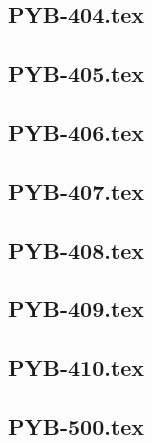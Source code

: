 \renewcommand{\xxexo}{PYB-404.tex} 
\subsection*{\xxexo} 
\graphicspath{{../../exos/python_bases/PYB-404/}}
 
 
\renewcommand{\xxexo}{PYB-405.tex} 
\subsection*{\xxexo} 
\graphicspath{{../../exos/python_bases/PYB-405/}}
 
 
\renewcommand{\xxexo}{PYB-406.tex} 
\subsection*{\xxexo} 
\graphicspath{{../../exos/python_bases/PYB-406/}}
 
 
\renewcommand{\xxexo}{PYB-407.tex} 
\subsection*{\xxexo} 
\graphicspath{{../../exos/python_bases/PYB-407/}}
 
 
\renewcommand{\xxexo}{PYB-408.tex} 
\subsection*{\xxexo} 
\graphicspath{{../../exos/python_bases/PYB-408/}}
 
 
\renewcommand{\xxexo}{PYB-409.tex} 
\subsection*{\xxexo} 
\graphicspath{{../../exos/python_bases/PYB-409/}}
 
 
\renewcommand{\xxexo}{PYB-410.tex} 
\subsection*{\xxexo} 
\graphicspath{{../../exos/python_bases/PYB-410/}}
 
 
\renewcommand{\xxexo}{PYB-500.tex} 
\subsection*{\xxexo} 
\graphicspath{{../../exos/python_bases/PYB-500/}}
 
 
